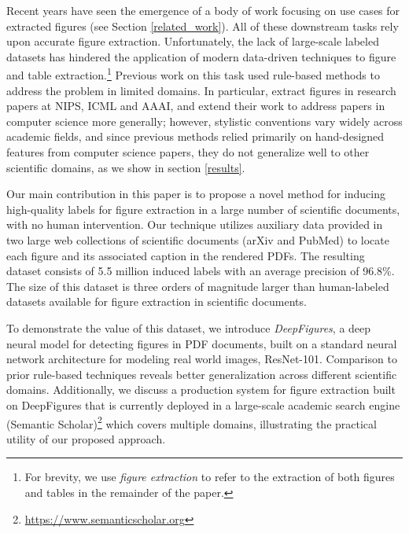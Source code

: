\documentclass[sigconf]{acmart}
\begin{document}
Recent years have seen the emergence of a body of work focusing on use cases for extracted figures (see Section \ref{related_work}). All of these downstream tasks rely upon accurate figure extraction. Unfortunately, the lack of large-scale labeled datasets has hindered the application of modern data-driven techniques to figure and table extraction.\footnote{For brevity, we use \emph{figure extraction} to refer to the extraction of both figures and tables in the remainder of the paper.}
Previous work on this task used rule-based methods to address the problem in limited domains.
In particular, \cite{pdffigures} extract figures in research papers at NIPS, ICML and AAAI, and \cite{pdffigures2} extend their work to address papers in computer science more generally; however, stylistic conventions vary widely across academic fields, and since previous methods relied primarily on hand-designed features from computer science papers, they do not generalize well to other scientific domains, as we show in section \ref{results}.

Our main contribution in this paper is to propose a novel method for inducing high-quality labels for figure extraction in a large number of scientific documents, with no human intervention.
Our technique utilizes auxiliary data provided in two large web collections of scientific documents (arXiv and PubMed) to locate each figure and its associated caption in the rendered PDFs.
The resulting dataset consists of 5.5 million induced labels with an average precision of 96.8\%.
The size of this dataset is three orders of magnitude larger than human-labeled datasets available for figure extraction in scientific documents.


To demonstrate the value of this dataset, we introduce \emph{DeepFigures}, a deep neural model for detecting figures in PDF documents, built on a standard neural network architecture for modeling real world images, ResNet-101.
Comparison to prior rule-based techniques reveals better generalization across different scientific domains. 
Additionally, we discuss a production system for figure extraction built on DeepFigures that is currently deployed in a large-scale academic search engine (Semantic Scholar)\footnote{\url{https://www.semanticscholar.org}} which covers multiple domains, illustrating the practical utility of our proposed approach.
\end{document}
